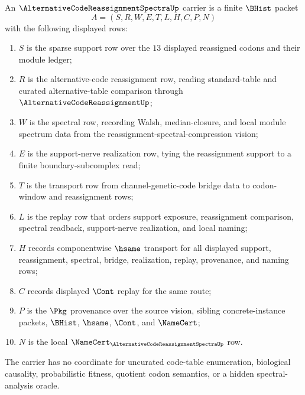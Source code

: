 \begin{definition}
\label{def:alternative-code-reassignment-spectra-carrier}
An $\AlternativeCodeReassignmentSpectraUp$ carrier is a finite $\BHist$ packet
$$
A=(S,R,W,E,T,L,H,C,P,N)
$$
with the following displayed rows:
\begin{enumerate}
\item $S$ is the sparse support row over the $13$ displayed reassigned codons and their module ledger;
\item $R$ is the alternative-code reassignment row, reading standard-table and curated alternative-table comparison through $\AlternativeCodeReassignmentUp$;
\item $W$ is the spectral row, recording Walsh, median-closure, and local module spectrum data from the reassignment-spectral-compression vision;
\item $E$ is the support-nerve realization row, tying the reassignment support to a finite boundary-subcomplex read;
\item $T$ is the transport row from channel-genetic-code bridge data to codon-window and reassignment rows;
\item $L$ is the replay row that orders support exposure, reassignment comparison, spectral readback, support-nerve realization, and local naming;
\item $H$ records componentwise $\hsame$ transport for all displayed support, reassignment, spectral, bridge, realization, replay, provenance, and naming rows;
\item $C$ records displayed $\Cont$ replay for the same route;
\item $P$ is the $\Pkg$ provenance over the source vision, sibling concrete-instance packets, $\BHist$, $\hsame$, $\Cont$, and $\NameCert$;
\item $N$ is the local $\NameCert_{\AlternativeCodeReassignmentSpectraUp}$ row.
\end{enumerate}
The carrier has no coordinate for uncurated code-table enumeration, biological causality, probabilistic fitness, quotient codon semantics, or a hidden spectral-analysis oracle.
\end{definition}

